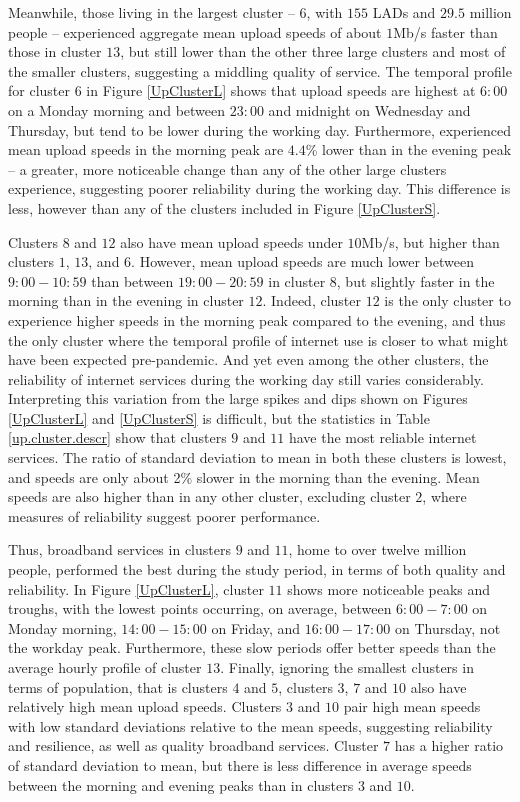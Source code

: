 \documentclass[Royal,times,sageh]{sagej}
\begin{document}
Meanwhile, those living in the largest cluster -- \(6\), with \(155\)
LADs and \(29.5\) million people -- experienced aggregate mean upload
speeds of about \(1\)Mb/s faster than those in cluster \(13\), but still
lower than the other three large clusters and most of the smaller
clusters, suggesting a middling quality of service. The temporal profile
for cluster \(6\) in Figure \ref{UpClusterL} shows that upload speeds
are highest at \(6:00\) on a Monday morning and between \(23:00\) and
midnight on Wednesday and Thursday, but tend to be lower during the
working day. Furthermore, experienced mean upload speeds in the morning
peak are \(4.4\)\% lower than in the evening peak -- a greater, more
noticeable change than any of the other large clusters experience,
suggesting poorer reliability during the working day. This difference is
less, however than any of the clusters included in Figure
\ref{UpClusterS}.

Clusters \(8\) and \(12\) also have mean upload speeds under \(10\)Mb/s,
but higher than clusters \(1\), \(13\), and \(6\). However, mean upload
speeds are much lower between \(9:00-10:59\) than between
\(19:00-20:59\) in cluster \(8\), but slightly faster in the morning
than in the evening in cluster \(12\). Indeed, cluster \(12\) is the
only cluster to experience higher speeds in the morning peak compared to
the evening, and thus the only cluster where the temporal profile of
internet use is closer to what might have been expected pre-pandemic.
And yet even among the other clusters, the reliability of internet
services during the working day still varies considerably. Interpreting
this variation from the large spikes and dips shown on Figures
\ref{UpClusterL} and \ref{UpClusterS} is difficult, but the statistics
in Table \ref{up.cluster.descr} show that clusters \(9\) and \(11\) have
the most reliable internet services. The ratio of standard deviation to
mean in both these clusters is lowest, and speeds are only about 2\%
slower in the morning than the evening. Mean speeds are also higher than
in any other cluster, excluding cluster \(2\), where measures of
reliability suggest poorer performance.

Thus, broadband services in clusters \(9\) and \(11\), home to over
twelve million people, performed the best during the study period, in
terms of both quality and reliability. In Figure \ref{UpClusterL},
cluster \(11\) shows more noticeable peaks and troughs, with the lowest
points occurring, on average, between \(6:00-7:00\) on Monday morning,
\(14:00-15:00\) on Friday, and \(16:00-17:00\) on Thursday, not the
workday peak. Furthermore, these slow periods offer better speeds than
the average hourly profile of cluster \(13\). Finally, ignoring the
smallest clusters in terms of population, that is clusters \(4\) and
\(5\), clusters \(3\), \(7\) and \(10\) also have relatively high mean
upload speeds. Clusters \(3\) and \(10\) pair high mean speeds with low
standard deviations relative to the mean speeds, suggesting reliability
and resilience, as well as quality broadband services. Cluster \(7\) has
a higher ratio of standard deviation to mean, but there is less
difference in average speeds between the morning and evening peaks than
in clusters \(3\) and \(10\).
\end{document}
